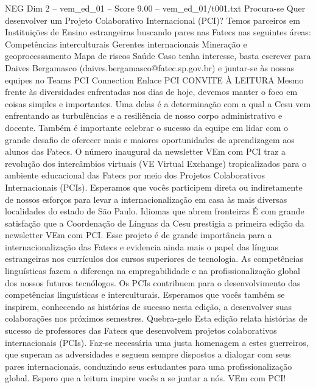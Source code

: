 \begin{textsample}{NEG Dim 2 – vem\_ed\_01 – Score 9.00 – vem\_ed\_01/t001.txt}  \label{ex:f2_neg_129}
Procura-se Quer desenvolver um Projeto Colaborativo Internacional (PCI)?
Temos parceiros em Instituições de Ensino estrangeiras buscando pares nas Fatecs nas seguintes áreas: Competências interculturais Gerentes internacionais Mineração e geoprocessamento Mapa de riscos Saúde Caso tenha interesse, basta escrever para Daives Bergamasco (daives.bergamasco@fatec.sp.gov.br) e juntar-se às nossas equipes no Teams PCI Connection Enlace PCI CONVITE À LEITURA Mesmo frente às diversidades enfrentadas nos dias de hoje, devemos manter o foco em coisas simples e importantes.
Uma delas é a determinação com a qual a Cesu vem enfrentando as turbulências e a resiliência de nosso corpo administrativo e docente.
Também é importante celebrar o sucesso da equipe em lidar com o grande desafio de oferecer mais e maiores oportunidades de aprendizagem aos alunos das Fatecs.
O número inaugural da newsletter VEm com PCI traz a revolução dos intercâmbios virtuais (VE Virtual Exchange) tropicalizados para o ambiente educacional das Fatecs por meio dos Projetos Colaborativos Internacionais (PCIs).
Esperamos que vocês participem direta ou indiretamente de nossos esforços para levar a internacionalização em casa às mais diversas localidades do estado de São Paulo.
Idiomas que abrem fronteiras É com grande satisfação que a Coordenação de Línguas da Cesu prestigia a primeira edição da newsletter VEm com PCI.
Esse projeto é de grande importância para a internacionalização das Fatecs e evidencia ainda mais o papel das línguas estrangeiras nos currículos dos cursos superiores de tecnologia.
As competências linguísticas fazem a diferença na empregabilidade e na profissionalização global dos nossos futuros tecnólogos.
Os PCIs contribuem para o desenvolvimento das competências linguísticas e interculturais.
Esperamos que vocês também se inspirem, conhecendo as histórias de sucesso nesta edição, a desenvolver suas colaborações nos próximos semestres.
Quebra-gelo Esta edição relata histórias de sucesso de professores das Fatecs que desenvolvem projetos colaborativos internacionais (PCIs).
Faz-se necessária uma justa homenagem a estes guerreiros, que superam as adversidades e seguem sempre dispostos a dialogar com seus pares internacionais, conduzindo seus estudantes para uma profissionalização global.
Espero que a leitura inspire vocês a se juntar a nós.
VEm com PCI!

\end{textsample}
